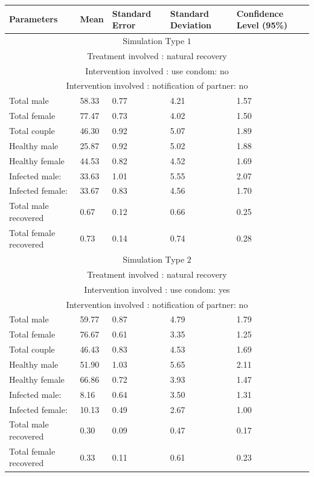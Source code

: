 \documentclass{article}
\begin{document}
\begin{normalsize}
\begin{longtable}{|p{5cm}|p{3cm}|p{3cm}|p{3cm}|p{3cm}|}
	\hline
	Parameters  & Mean & Standard Error & Standard Deviation & Confidence Level (95\%)\\ 
	\hline
	\multicolumn{5}{|c|}{Simulation Type $1$} \\
	\multicolumn{5}{|c|}{Treatment involved : natural recovery} \\
	\multicolumn{5}{|c|}{Intervention involved : use condom: no} \\
	\multicolumn{5}{|c|}{Intervention involved : notification of partner: no} \\
	\hline
	Total male & 58.33 &  0.77 & 4.21 & 1.57\\
	Total female & 77.47 & 0.73 & 4.02 & 1.50\\
	Total couple & 46.30 & 0.92 & 5.07 & 1.89 \\
	Healthy male & 25.87 & 0.92 & 5.02 & 1.88 \\
	Healthy female & 44.53 & 0.82 & 4.52 & 1.69 \\
	Infected male: & 33.63 & 1.01 & 5.55 & 2.07 \\
	Infected female: & 33.67 & 0.83 & 4.56 & 1.70\\
	Total male recovered & 0.67 & 0.12 & 0.66 & 0.25\\
	Total female recovered & 0.73 & 0.14 & 0.74 & 0.28\\
	\hline
	\multicolumn{5}{|c|}{Simulation Type $2$} \\
	\multicolumn{5}{|c|}{Treatment involved : natural recovery} \\
	\multicolumn{5}{|c|}{Intervention involved : use condom: yes} \\
	\multicolumn{5}{|c|}{Intervention involved : notification of partner: no} \\
	\hline
	Total male & 59.77 & 0.87 & 4.79 & 1.79 \\
	Total female & 76.67 & 0.61 & 3.35 & 1.25 \\
	Total couple & 46.43 & 0.83 & 4.53 & 1.69\\
	Healthy male & 51.90 & 1.03 & 5.65 & 2.11\\
	Healthy female & 66.86 & 0.72 & 3.93 & 1.47 \\
	Infected male: & 8.16 & 0.64 & 3.50 & 1.31\\
	Infected female: & 10.13 & 0.49 & 2.67 & 1.00\\
	Total male recovered & 0.30 & 0.09 & 0.47 & 0.17\\
	Total female recovered & 0.33 & 0.11 & 0.61 & 0.23\\	

\end{longtable}
\end{normalsize}
\end{document}
